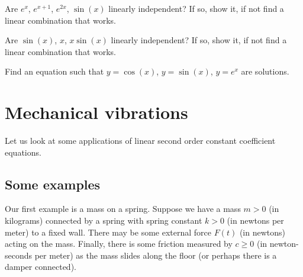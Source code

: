 \begin{exercise}
Are $e^{x}$, $e^{x+1}$, $e^{2x}$, $\sin(x)$ linearly independent?
If so, show it, if not find a linear combination that works.
\end{exercise}

\begin{exercise}
Are $\sin(x)$, $x$, $x\sin(x)$ linearly independent?
If so, show it, if not find a linear combination that works.
\end{exercise}

\begin{exercise}
Find an equation such that $y=\cos(x)$, $y=\sin(x)$, $y=e^x$ are solutions.
\end{exercise}


\sectionnewpage
\section{Mechanical vibrations} \label{sec:mv}


Let us look at some applications of linear second order constant
coefficient equations.

\subsection{Some examples}

\begin{mywrapfigsimp}{2.0in}{2.3in}
\noindent
{}
\end{mywrapfigsimp}
Our first example is a mass on a spring.  Suppose we have a mass $m > 0$
(in kilograms) connected
by a spring with spring constant $k > 0$ (in newtons per meter)
to a fixed wall.  There may be some external
force $F(t)$ (in newtons) acting on the mass.  Finally, there is some
friction measured by $c \geq 0$ (in newton-seconds per meter) as the mass
slides along the floor (or perhaps there is a damper connected).

